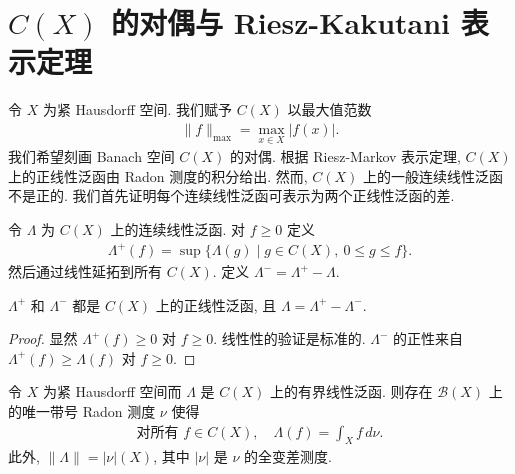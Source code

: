 \documentclass[../../main.tex]{subfiles}
\begin{document}
\section{$C(X)$ 的对偶与 Riesz-Kakutani 表示定理}\label{section:ch21-rieszkakutani}

令 $X$ 为紧 Hausdorff 空间. 我们赋予 $C(X)$ 以最大值范数
\begin{align*}
\|f\|_{\max}=\max_{x\in X}|f(x)|.
\end{align*}
我们希望刻画 Banach 空间 $C(X)$ 的对偶. 根据 Riesz-Markov 表示定理, $C(X)$ 上的正线性泛函由 Radon 测度的积分给出. 然而, $C(X)$ 上的一般连续线性泛函不是正的. 我们首先证明每个连续线性泛函可表示为两个正线性泛函的差.

\begin{definition}[正部分与负部分]\label{definition:ch21-正负部分}
令 $\Lambda$ 为 $C(X)$ 上的连续线性泛函. 对 $f\geqslant 0$ 定义
\begin{align*}
\Lambda^{+}(f)=\sup\{\Lambda(g)\mid g\in C(X),\ 0\leqslant g\leqslant f\}.
\end{align*}
然后通过线性延拓到所有 $C(X)$. 定义 $\Lambda^{-}=\Lambda^{+}-\Lambda$.
\end{definition}

\begin{lemma}\label{lemma:ch21-正负部分正泛函}
$\Lambda^{+}$ 和 $\Lambda^{-}$ 都是 $C(X)$ 上的正线性泛函, 且 $\Lambda=\Lambda^{+}-\Lambda^{-}$.
\end{lemma}

\begin{proof}
显然 $\Lambda^{+}(f)\geqslant 0$ 对 $f\geqslant 0$. 线性性的验证是标准的. $\Lambda^{-}$ 的正性来自 $\Lambda^{+}(f)\geqslant\Lambda(f)$ 对 $f\geqslant 0$.
\end{proof}

\begin{theorem}\label{theorem:ch21-rieszkakutani}
令 $X$ 为紧 Hausdorff 空间而 $\Lambda$ 是 $C(X)$ 上的有界线性泛函. 则存在 $\mathcal{B}(X)$ 上的唯一带号 Radon 测度 $\nu$ 使得
\begin{align}\label{align:ch21-rieszkakutani等式}
\text{对所有 }f\in C(X),\quad\Lambda(f)=\int_{X}f\,d\nu.
\end{align}
此外, $\|\Lambda\|=|\nu|(X)$, 其中 $|\nu|$ 是 $\nu$ 的全变差测度.
\end{theorem}
\end{document}
